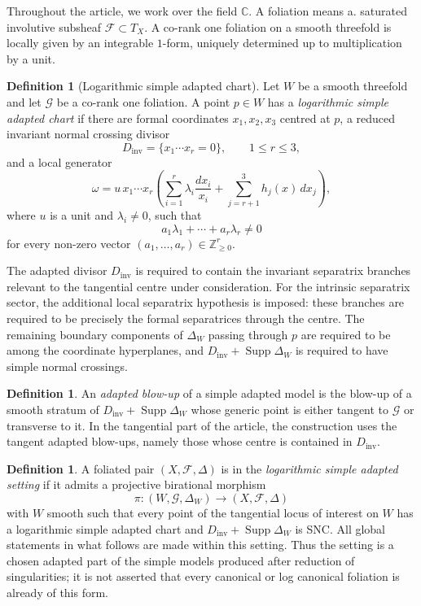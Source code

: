 \documentclass[11pt]{amsart}
\numberwithin{equation}{section}
\theoremstyle{plain}
\theoremstyle{definition}
\newtheorem{Definition}[Theorem]{Definition}
\newcommand{\Supp}{\operatorname{Supp}}
\newcommand{\Dinv}{D_{\mathrm{inv}}}
\newcommand{\bC}{\mathbb C}
\newcommand{\bZ}{\mathbb Z}
\newcommand{\cF}{\mathcal F}
\newcommand{\cG}{\mathcal G}
\begin{document}
 Throughout the article, we work over the field \(\bC\).  A foliation means a. saturated involutive subsheaf \(\cF\subset T_X\).  A co-rank one foliation on a smooth threefold is locally given by an integrable \(1\)-form, uniquely
determined up to multiplication by a unit.

\begin{Definition}[Logarithmic simple adapted chart]
\label{def:simple-chart}
Let \(W\) be a smooth threefold and let \(\mathcal G\) be a co-rank one
foliation.  A point \(p\in W\) has a \emph{logarithmic simple adapted chart}
if there are formal coordinates \(x_1,x_2,x_3\) centred at \(p\), a reduced
invariant normal crossing divisor
\[
\Dinv=\{x_1\cdots x_r=0\},
\qquad 1\le r\le 3,
\]
and a local generator
\[
\omega=
u\,x_1\cdots x_r
\left(
\sum_{i=1}^r\lambda_i\frac{dx_i}{x_i}
+
\sum_{j=r+1}^3 h_j(x)\,dx_j
\right),
\]
where \(u\) is a unit and \(\lambda_i\ne0\), such that
\[
a_1\lambda_1+\cdots+a_r\lambda_r\ne0
\]
for every non-zero vector \((a_1,\ldots,a_r)\in\bZ_{\geq 0}^r\).

The adapted divisor \(\Dinv\) is required to contain the invariant
separatrix branches relevant to the tangential centre under consideration.
For the intrinsic separatrix sector, the additional local separatrix hypothesis is imposed:
these branches are required to be precisely the formal
separatrices through the centre.  The remaining boundary components of
\(\Delta_W\) passing through \(p\) are required to be among the coordinate
hyperplanes, and \(\Dinv+\operatorname{Supp}\Delta_W\) is required to
have simple normal crossings.
\end{Definition}



\begin{Definition}
An \emph{adapted blow-up} of a simple adapted model is the blow-up of a smooth stratum of $\Dinv+\Supp\Delta_W$ whose generic point is either tangent to $\cG$ or transverse to it.  In the tangential part of the article, the construction uses the tangent adapted blow-ups, namely those whose centre is contained in $\Dinv$.
\end{Definition}

\begin{Definition}
A foliated pair $(X,\cF,\Delta)$ is in the \emph{logarithmic simple adapted setting} if it admits a projective birational morphism
\[
\pi:(W,\cG,\Delta_W)\to (X,\cF,\Delta)
\]
with $W$ smooth such that every point of the tangential locus of interest on $W$ has a logarithmic simple adapted chart and $\Dinv+\Supp\Delta_W$ is SNC.  All global statements in what follows are made within this setting.  Thus the setting is a chosen adapted part of the simple models produced after reduction of singularities; it is not asserted that every canonical or log canonical foliation is already of this form.
\end{Definition}
\end{document}
